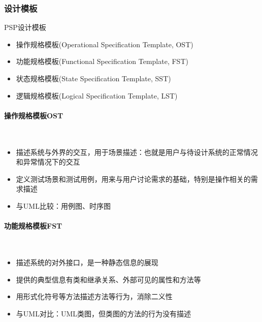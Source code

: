 \subsubsection{设计模板}
\begin{table}
    \centering
    \vspace{-1em}
    \caption*{PSP设计模板展现的信息}
    \vspace{-1.5em}
\end{table}
PSP设计模板
\begin{itemize}
    \item 操作规格模板(Operational Specification Template, OST)
    \item 功能规格模板(Functional Specification Template, FST)
    \item 状态规格模板(State Specification Template, SST)
    \item 逻辑规格模板(Logical Specification Template, LST)
\end{itemize}


\paragraph{操作规格模板OST}~{} \par
\begin{itemize}
    \item 描述系统与外界的交互，用于场景描述：也就是用户与待设计系统的正常情况和异常情况下的交互
    \item 定义测试场景和测试用例，用来与用户讨论需求的基础，特别是操作相关的需求描述
    \item 与UML比较：用例图、时序图
\end{itemize}

\paragraph{功能规格模板FST}~{} \par
\vspace{-0.8em}
\begin{multicols}{2}
    \begin{itemize}
        \item 描述系统的对外接口，是一种静态信息的展现
        \item 提供的典型信息有类和继承关系、外部可见的属性和方法等
        \item 用形式化符号等方法描述方法等行为，消除二义性
        \item 与UML对比：UML类图，但类图的方法的行为没有描述
    \end{itemize}
\end{multicols}
\vspace{-1em}

